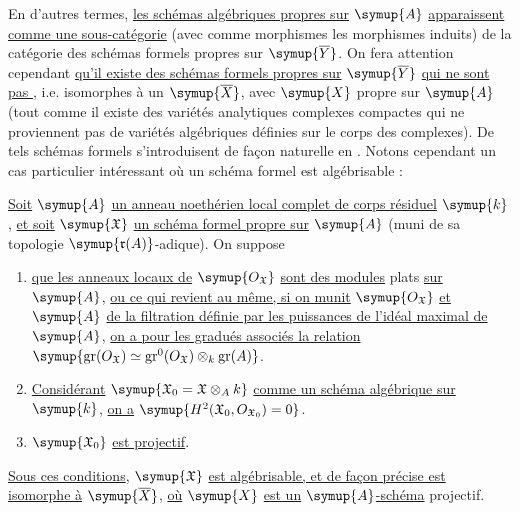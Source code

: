 En d'autres termes, \uline{les schémas algébriques propres sur} $\symup{A}$ \uline{apparaissent comme
une sous-catégorie} (avec comme morphismes les morphismes induits) de la
catégorie des schémas formels propres sur $\symup{\overline Y}$. On fera attention
cependant \uline{qu'il existe des schémas formels propres sur} $\symup{\overline Y}$ \uline{qui ne
sont pas }, i.e. isomorphes à un $\symup{\overline X}$, avec $\symup{X}$ propre
sur $\symup{A}$ (tout comme il existe des variétés analytiques complexes compactes qui
ne proviennent pas de variétés algébriques définies sur le corps des complexes).
De tels schémas formels s'introduisent de façon naturelle en \uline{}. Notons cependant un cas particulier intéressant où un schéma formel
est algébrisable :

 \uline{Soit} $\symup{A}$ \uline{un anneau noethérien local complet de corps
résiduel} $\symup{k}$, \uline{et soit} $\symup{\mathfrak X}$ \uline{un schéma formel propre sur} $\symup{A}$ (muni de sa
topologie $\symup{\mathfrak r(A)}$-adique). On suppose
\begin{enumerate}
  \item[\textnormal{i.}] \uline{que les anneaux locaux de} $\symup{O_{\mathfrak X}}$ \uline{sont des
    modules} plats \uline{sur} $\symup{A}$, \uline{ou ce qui revient au même, si on munit}
    $\symup{O_{\mathfrak X}}$ \uline{et} $\symup{A}$ \uline{de la filtration définie par les puissances de
    l'idéal maximal de} $\symup{A}$, \uline{on a pour les gradués associés la relation}
    $\symup{\operatorname{gr}(O_{\mathfrak X})\simeq
      \operatorname{gr}^{0}(O_{\mathfrak X})\otimes_k\operatorname{gr}(A)}$.
  \item[\textnormal{ii.}] \uline{Considérant}
    $\symup{\mathfrak X_0=\mathfrak X\otimes_A k}$ \uline{comme un schéma algébrique sur} $\symup{k}$,
    \uline{on a}
    $\symup{H^2(\mathfrak X_0,O_{\mathfrak X_0})=0}$.
  \item[\textnormal{iii.}] $\symup{\mathfrak X_0}$ \uline{est projectif}.
\end{enumerate}
\uline{Sous ces conditions}, $\symup{\mathfrak X}$ \uline{est algébrisable, et de façon précise est
isomorphe à} $\symup{\overline X}$, \uline{où} $\symup{X}$ \uline{est un} $\symup{A}$\uline{-schéma} projectif.

